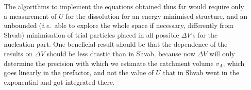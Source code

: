 \documentclass[12pt]{paper}    %
\newcommand{\ie}{\textit{i.e.}~}
\begin{document}
The algorithms to implement the equations obtained thus far would require only a measurement of $U$ for the dissolution for an energy minimised structure, and an unbounded (\ie able to explore the whole space if necessary, differently from Shvab) minimisation of trial particles placed in all possible $\Delta V$'s for the nucleation part. One beneficial result should be that the dependence of the results on $\Delta V$ should be less drastic than in Shvab, because now $\Delta V$ will only determine the precision with which we estimate the catchment volume $v_A$, which goes linearly in the prefactor, and not the value of $U$ that in Shvab went in the exponential and got integrated there.





%
%
%
%


%


\end{document}
